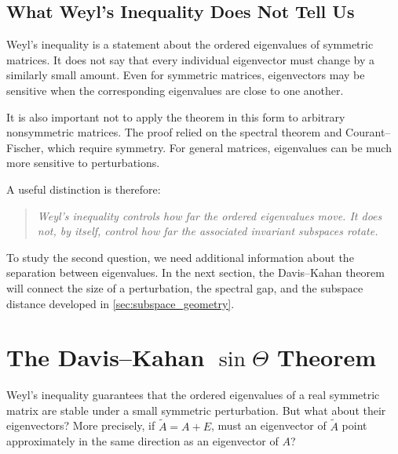 \documentclass[14pt,letterpaper]{article}
\theoremstyle{plain}
\theoremstyle{definition}
\theoremstyle{remark}
\begin{document}

\subsection{What Weyl's Inequality Does Not Tell Us}
\label{subsec:weyl_limitations}

Weyl's inequality is a statement about the ordered
eigenvalues of symmetric matrices. It does not say
that every individual eigenvector must change by a
similarly small amount. Even for symmetric matrices,
eigenvectors may be sensitive when the corresponding
eigenvalues are close to one another.

It is also important not to apply the theorem in
this form to arbitrary nonsymmetric matrices.
The proof relied on the spectral theorem and
Courant--Fischer, which require symmetry.
For general matrices, eigenvalues can be much more
sensitive to perturbations.

A useful distinction is therefore:
\begin{quote}
\emph{Weyl's inequality controls how far the ordered
eigenvalues move. It does not, by itself, control
how far the associated invariant subspaces rotate.}
\end{quote}

To study the second question, we need additional
information about the separation between eigenvalues.
In the next section, the Davis--Kahan theorem will
connect the size of a perturbation, the spectral gap,
and the subspace distance developed in
\cref{sec:subspace_geometry}.


\section{The Davis--Kahan \texorpdfstring{$\sin\Theta$}{sin Theta} Theorem}
\label{sec:davis_kahan}

Weyl's inequality guarantees that the ordered eigenvalues
of a real symmetric matrix are stable under a small symmetric
perturbation. But what about their eigenvectors? More
precisely, if $\widetilde A=A+E$, must an eigenvector of
$\widetilde A$ point approximately in the same direction
as an eigenvector of $A$?
\end{document}
